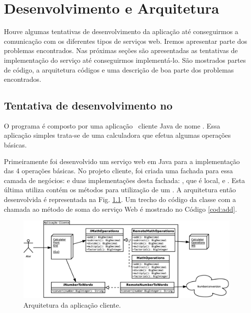 %

\chapter{Desenvolvimento e Arquitetura}

Houve algumas tentativas de desenvolvimento da aplicação até conseguirmos a
comunicação com os diferentes tipos de serviços web. Iremos apresentar parte dos
problemas encontrados. Nas próximas seções são apresentadas as tentativas de
implementação do serviço até conseguirmos implementá-lo. São mostrados partes de
código, a arquitetura códigos e uma descrição de boa parte dos problemas
encontrados. 

\section{Tentativa de desenvolvimento no \NetBeansv}

O programa é composto por uma aplicação \desktop\ cliente Java de nome
. Essa aplicação simples trata-se de uma calculadora que
efetua algumas operações básicas. 

Primeiramente foi desenvolvido um serviço web em Java para a implementação das 4
operações básicas. No projeto cliente, foi criada uma fachada para essa camada
de negócios:  e duas implementações desta fachada:
, que é local, e . Esta última
utiliza contém os métodos para utilização de um \WebService. A arquitetura então
desenvolvida é representada na Fig.  \ref{fig:arquitetura:calc}. Um trecho do
código da classe  com a chamada ao método de soma do
serviço Web é mostrado no Código \ref{cod:add}.

\begin{figure}[htb]
  \centering
    \includegraphics[width=\textwidth]{imgs/calculadora}
  \caption{Arquitetura da aplicação cliente.}
  \label{fig:arquitetura:calc}
\end{figure}

